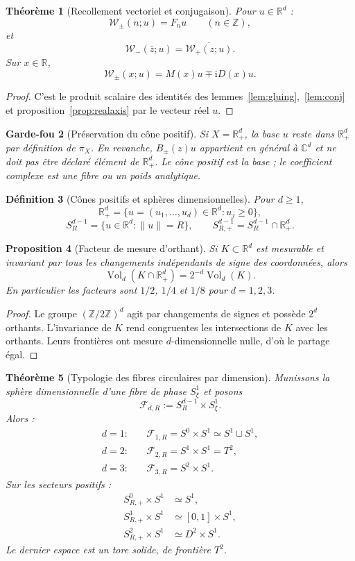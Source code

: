 \documentclass[11pt,a4paper]{article}
\newtheorem{theorem}{Théorème}[section]
\newtheorem{proposition}[theorem]{Proposition}
\newtheorem{definition}[theorem]{Définition}
\newtheorem{guardrail}[theorem]{Garde-fou}
\newcommand{\R}{\mathbb R}
\newcommand{\C}{\mathbb C}
\newcommand{\Z}{\mathbb Z}
\newcommand{\Rp}{\mathbb R_{+}}
\newcommand{\ii}{\mathrm i}
\newcommand{\Vol}{\operatorname{Vol}}
\begin{document}
\begin{theorem}[Recollement vectoriel et conjugaison]
Pour $u\in\R^d$ :
\[
 \mathcal W_\pm(n;u)=F_nu\qquad(n\in\Z),
\]
et
\[
 \mathcal W_-(\bar z;u)=\overline{\mathcal W_+(z;u)}.
\]
Sur $x\in\R$,
\[
 \mathcal W_\pm(x;u)=M(x)u\mp\ii D(x)u.
\]
\end{theorem}

\begin{proof}
C'est le produit scalaire des identités des lemmes~\ref{lem:gluing},~\ref{lem:conj} et proposition~\ref{prop:realaxis} par le vecteur réel $u$.
\end{proof}

\begin{guardrail}[Préservation du cône positif]
Si $X=\Rp^d$, la base $u$ reste dans $\Rp^d$ par définition de $\pi_X$. En revanche, $B_\pm(z)u$ appartient en général à $\C^d$ et ne doit pas être déclaré élément de $\Rp^d$. Le cône positif est la base ; le coefficient complexe est une fibre ou un poids analytique.
\end{guardrail}

\begin{definition}[Cônes positifs et sphères dimensionnelles]
Pour $d\ge1$,
\[
 \Rp^d=\{u=(u_1,\ldots,u_d)\in\R^d:u_j\ge0\},
\]
\[
 S_R^{d-1}=\{u\in\R^d:\|u\|=R\},\qquad
 S_{R,+}^{d-1}=S_R^{d-1}\cap\Rp^d.
\]
\end{definition}

\begin{proposition}[Facteur de mesure d'orthant]\label{prop:orthant}
Si $K\subset\R^d$ est mesurable et invariant par tous les changements indépendants de signe des coordonnées, alors
\[
 \Vol_d(K\cap\Rp^d)=2^{-d}\Vol_d(K).
\]
En particulier les facteurs sont $1/2$, $1/4$ et $1/8$ pour $d=1,2,3$.
\end{proposition}

\begin{proof}
Le groupe $(\Z/2\Z)^d$ agit par changements de signes et possède $2^d$ orthants. L'invariance de $K$ rend congruentes les intersections de $K$ avec les orthants. Leurs frontières ont mesure $d$-dimensionnelle nulle, d'où le partage égal.
\end{proof}

\begin{theorem}[Typologie des fibres circulaires par dimension]\label{thm:fibre-dim}
Munissons la sphère dimensionnelle d'une fibre de phase $S^1_\xi$ et posons
\[
 \mathcal F_{d,R}:=S_R^{d-1}\times S^1_\xi.
\]
Alors :
\begin{align*}
 d=1:&\quad \mathcal F_{1,R}=S^0\times S^1\simeq S^1\sqcup S^1,\\
 d=2:&\quad \mathcal F_{2,R}=S^1\times S^1=T^2,\\
 d=3:&\quad \mathcal F_{3,R}=S^2\times S^1.
\end{align*}
Sur les secteurs positifs :
\begin{align*}
 S^0_{R,+}\times S^1&\simeq S^1,\\
 S^1_{R,+}\times S^1&\simeq [0,1]\times S^1,\\
 S^2_{R,+}\times S^1&\simeq D^2\times S^1.
\end{align*}
Le dernier espace est un tore solide, de frontière $T^2$.
\end{theorem}
\end{document}
